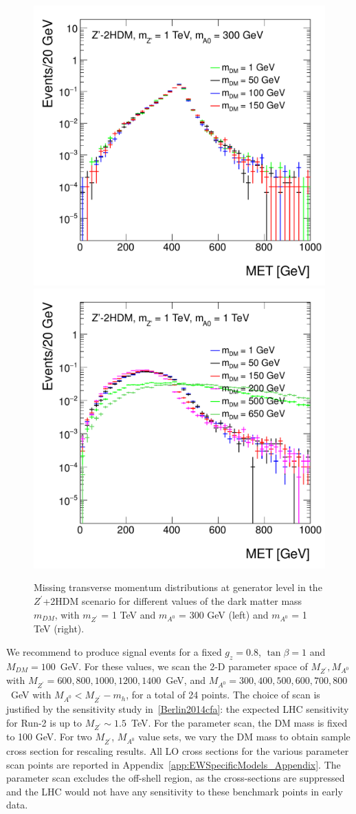   \begin{figure}[hbpt!]
  	\begin{center}
  		\includegraphics[width=0.49\linewidth]{figures/EW/monoH/zp2hdm_a0_300_MET_et_Log}
  		\includegraphics[width=0.49\linewidth]{figures/EW/monoH/zp2hdm_a0_1000_MET_et_Log}
  		\caption{Missing transverse momentum distributions at generator level in the $Z^\prime$+2HDM 
  			scenario for different values of the dark matter mass $m_{DM}$, with 
  			$m_{Z^\prime}$ = 1 TeV and $m_{A^0}$ = 300 GeV (left) and $m_{A^0}$ = 1 TeV (right).
  			\label{fig:zprimeDecay}}
  	\end{center}
  \end{figure}
  
We recommend to produce signal events for a fixed $g_z=0.8$, $\tan{\beta}=1$ and $M_{DM}=100$~GeV. For these values, we scan the 2-D parameter space of ${M_{Z^\prime}, M_{A^0}}$ with $M_{Z^\prime}=600, 800, 1000, 1200, 1400$~GeV, and $M_{A^0}=300, 400, 500, 600, 700, 800$~GeV with $M_{A^0} < M_{Z^\prime}-m_h$, for a total of 24 points. The choice of scan is justified by the sensitivity study in~\ref{Berlin2014cfa}: the expected LHC sensitivity for Run-2 is up to $M_{Z^\prime} \sim 1.5$~TeV.
For the parameter scan, the DM mass is fixed to 100 GeV. For two $M_{Z^\prime}$, $M_{A^0}$ value sets, we vary the DM mass to obtain sample cross section for rescaling results. 
All LO cross sections for the various parameter scan points are reported in Appendix~\ref{app:EWSpecificModels_Appendix}.
The parameter scan excludes the off-shell region, as the cross-sections are suppressed and the LHC would not have any
sensitivity to these benchmark points in early data. 

